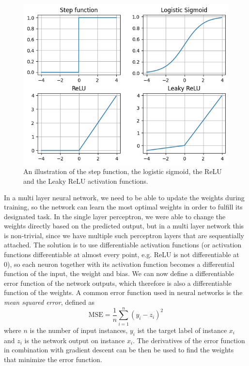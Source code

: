 \begin{figure}
	\includegraphics[width=\linewidth]{activation-functions.png}
	\caption{An illustration of the step function, the logistic sigmoid, the ReLU and the Leaky ReLU activation functions.}
	\label{activation_functions}
\end{figure}

In a multi layer neural network, we need to be able to update the weights during training, so the network can learn the most optimal weights in order to fulfill its designated task. In the single layer perceptron, we were able to change the weights directly based on the predicted output, but in a multi layer network this is non-trivial, since we have multiple such perceptron layers that are sequentially attached. The solution is to use differentiable activation functions (or activation functions differentiable at almost every point, e.g. ReLU is not differentiable at 0), so each neuron together with its activation function becomes a differential function of the input, the weight and bias. We can now define a differentiable error function of the network outputs, which therefore is also a differentiable function of the weights. A common error function used in neural networks is the \textit{mean squared error}, defined as
$$\text{MSE} = \frac{1}{n} \sum^n_{i=1}{(y_i - z_i)^2}$$
where $n$ is the number of input instances, $y_i$ ist the target label of instance $x_i$ and $z_i$ is the network output on instance $x_i$. The derivatives of the error function in combination with gradient descent can be then be used to find the weights that minimize the error function. \cite{neural_networks_pattern_recognition}


